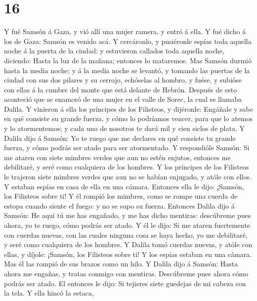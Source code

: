 \hypertarget{section-15}{%
\section{16}\label{section-15}}

 Y fué Samsón á Gaza, y vió allí una mujer ramera, y entró á
ella.  Y fué dicho á los de Gaza: Samsón es venido acá. Y
cercáronlo, y pusiéronle espías toda aquella noche á la puerta de la
ciudad: y estuvieron callados toda aquella noche, diciendo: Hasta la luz
de la mañana; entonces lo mataremos.  Mas Samsón durmió
hasta la media noche; y á la media noche se levantó, y tomando las
puertas de la ciudad con sus dos pilares y su cerrojo, echóselas al
hombro, y fuése, y subióse con ellas á la cumbre del monte que está
delante de Hebrón.  Después de esto aconteció que se enamoró
de una mujer en el valle de Sorec, la cual se llamaba Dalila.
 Y vinieron á ella los príncipes de los Filisteos, y
dijéronle: Engáñale y sabe en qué consiste su grande fuerza, y cómo lo
podríamos vencer, para que lo atemos y lo atormentemos; y cada uno de
nosotros te dará mil y cien siclos de plata.  Y Dalila dijo
á Samsón: Yo te ruego que me declares en qué consiste tu grande fuerza,
y cómo podrás ser atado para ser atormentado.  Y respondióle
Samsón: Si me ataren con siete mimbres verdes que aun no estén enjutos,
entonces me debilitaré, y seré como cualquiera de los hombres.
 Y los príncipes de los Filisteos le trajeron siete mimbres
verdes que aun no se habían enjugado, y atóle con ellos.  Y
estaban espías en casa de ella en una cámara. Entonces ella le dijo:
¡Samsón, los Filisteos sobre ti! Y él rompió los mimbres, como se rompe
una cuerda de estopa cuando siente el fuego: y no se supo su fuerza.
 Entonces Dalila dijo á Samsón: He aquí tú me has engañado,
y me has dicho mentiras: descúbreme pues ahora, yo te ruego, cómo podrás
ser atado.  Y él le dijo: Si me ataren fuertemente con
cuerdas nuevas, con las cuales ninguna cosa se haya hecho, yo me
debilitaré, y seré como cualquiera de los hombres.  Y
Dalila tomó cuerdas nuevas, y atóle con ellas, y díjole: ¡Samsón, los
Filisteos sobre ti! Y los espías estaban en una cámara. Mas él las
rompió de sus brazos como un hilo.  Y Dalila dijo á Samsón:
Hasta ahora me engañas, y tratas conmigo con mentiras. Descúbreme pues
ahora cómo podrás ser atado. El entonces le dijo: Si tejieres siete
guedejas de mi cabeza con la tela.  Y ella hincó la estaca,
